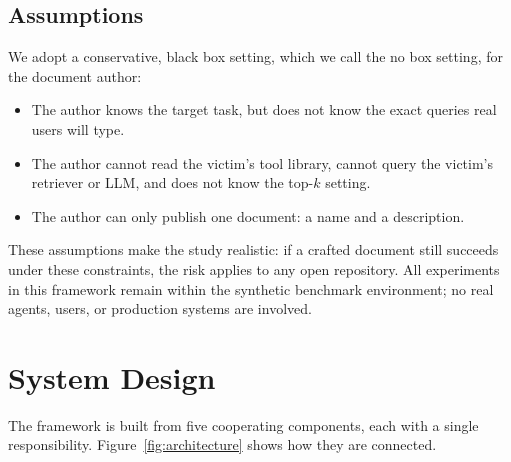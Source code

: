 \documentclass[11pt,a4paper]{report}
\begin{document}
\section{Assumptions}

We adopt a conservative, black box setting, which we call the no box
setting, for the document author:

\begin{itemize}
  \item The author knows the target task, but does not know the exact
  queries real users will type.
  \item The author cannot read the victim's tool library, cannot query
  the victim's retriever or LLM, and does not know the top-$k$ setting.
  \item The author can only publish one document: a name and a
  description.
\end{itemize}

These assumptions make the study realistic: if a crafted document still
succeeds under these constraints, the risk applies to any open
repository. All experiments in this framework remain within the synthetic
benchmark environment; no real agents, users, or production systems are
involved.

\chapter{System Design}

The framework is built from five cooperating components, each with a
single responsibility. Figure~\ref{fig:architecture} shows how they are
connected.
\end{document}
